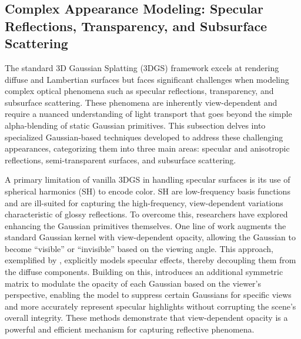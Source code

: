 \documentclass[11pt]{article}
\begin{document}
\subsection{Complex Appearance Modeling: Specular Reflections, Transparency, and Subsurface Scattering}

The standard 3D Gaussian Splatting (3DGS) framework excels at rendering diffuse and Lambertian surfaces but faces significant challenges when modeling complex optical phenomena such as specular reflections, transparency, and subsurface scattering. These phenomena are inherently view-dependent and require a nuanced understanding of light transport that goes beyond the simple alpha-blending of static Gaussian primitives. This subsection delves into specialized Gaussian-based techniques developed to address these challenging appearances, categorizing them into three main areas: specular and anisotropic reflections, semi-transparent surfaces, and subsurface scattering.

A primary limitation of vanilla 3DGS in handling specular surfaces is its use of spherical harmonics (SH) to encode color. SH are low-frequency basis functions and are ill-suited for capturing the high-frequency, view-dependent variations characteristic of glossy reflections. To overcome this, researchers have explored enhancing the Gaussian primitives themselves. One line of work augments the standard Gaussian kernel with view-dependent opacity, allowing the Gaussian to become ``visible'' or ``invisible'' based on the viewing angle. This approach, exemplified by \cite{ref598}, explicitly models specular effects, thereby decoupling them from the diffuse components. Building on this, \cite{ref599} introduces an additional symmetric matrix to modulate the opacity of each Gaussian based on the viewer's perspective, enabling the model to suppress certain Gaussians for specific views and more accurately represent specular highlights without corrupting the scene's overall integrity. These methods demonstrate that view-dependent opacity is a powerful and efficient mechanism for capturing reflective phenomena.
\end{document}
